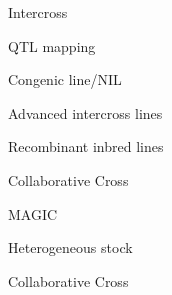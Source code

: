 \documentclass[aspectratio=169,12pt,t]{beamer}
\begin{document}
\begin{frame}[c]{Intercross}
\end{frame}





\begin{frame}[c]{QTL mapping}

\vspace{5mm}
\end{frame}


\begin{frame}[c]{Congenic line/NIL}


\end{frame}




\begin{frame}[c]{Advanced intercross lines}


\end{frame}


\begin{frame}[c]{Recombinant inbred lines}


\end{frame}


\begin{frame}[c]{Collaborative Cross}


\end{frame}


\begin{frame}[c]{MAGIC}


\end{frame}



\begin{frame}[c]{Heterogeneous stock}

  \vspace{2mm}


\end{frame}


\begin{frame}[c]{Collaborative Cross}


\end{frame}
\end{document}
